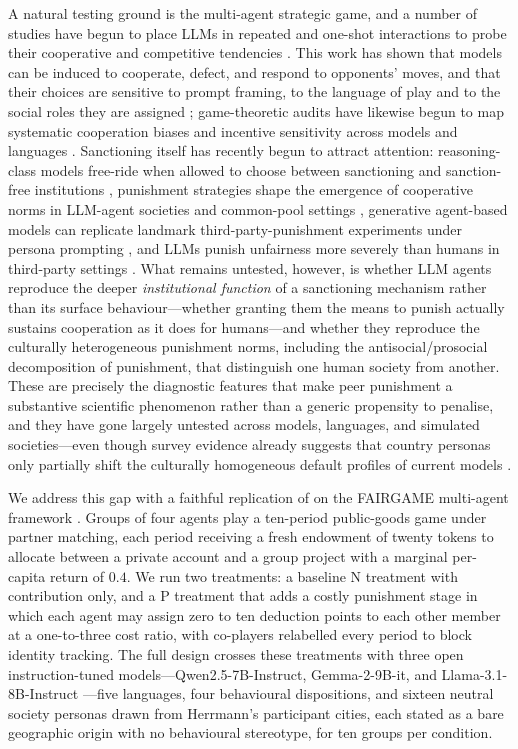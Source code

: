 \documentclass[openacc]{rsproca_new}
\begin{document}
A natural testing ground is the multi-agent strategic game, and a number of studies have begun to place LLMs in repeated and one-shot interactions to probe their cooperative and competitive tendencies \cite{akata2023playing, brookins2023playing, feng2024survey}. This work has shown that models can be induced to cooperate, defect, and respond to opponents' moves, and that their choices are sensitive to prompt framing, to the language of play and to the social roles they are assigned \cite{leng2023llm, tjuatja2024llms, buscemi2025communication}; game-theoretic audits have likewise begun to map systematic cooperation biases and incentive sensitivity across models and languages \cite{huynh2025understanding, huynh2026payoff}. Sanctioning itself has recently begun to attract attention: reasoning-class models free-ride when allowed to choose between sanctioning and sanction-free institutions \cite{piedrahita2025corrupted}, punishment strategies shape the emergence of cooperative norms in LLM-agent societies and common-pool settings \cite{warnakulasuriya2025evolution, gupta2025norm}, generative agent-based models can replicate landmark third-party-punishment experiments under persona prompting \cite{cross2025validating}, and LLMs punish unfairness more severely than humans in third-party settings \cite{liu2025outraged}. What remains untested, however, is whether LLM agents reproduce the deeper \emph{institutional function} of a sanctioning mechanism rather than its surface behaviour---whether granting them the means to punish actually sustains cooperation as it does for humans---and whether they reproduce the culturally heterogeneous punishment norms, including the antisocial/prosocial decomposition of punishment, that distinguish one human society from another. These are precisely the diagnostic features that make peer punishment a substantive scientific phenomenon rather than a generic propensity to penalise, and they have gone largely untested across models, languages, and simulated societies---even though survey evidence already suggests that country personas only partially shift the culturally homogeneous default profiles of current models \cite{tao2024cultural}.

We address this gap with a faithful replication of \cite{herrmann2008antisocial} on the FAIRGAME multi-agent framework \cite{fairgame2025}. Groups of four agents play a ten-period public-goods game under partner matching, each period receiving a fresh endowment of twenty tokens to allocate between a private account and a group project with a marginal per-capita return of $0.4$. We run two treatments: a baseline N treatment with contribution only, and a P treatment that adds a costly punishment stage in which each agent may assign zero to ten deduction points to each other member at a one-to-three cost ratio, with co-players relabelled every period to block identity tracking. The full design crosses these treatments with three open instruction-tuned models---Qwen2.5-7B-Instruct, Gemma-2-9B-it, and Llama-3.1-8B-Instruct \cite{qwen2025, gemma2024, llama2024}---five languages, four behavioural dispositions, and sixteen neutral society personas drawn from Herrmann's participant cities, each stated as a bare geographic origin with no behavioural stereotype, for ten groups per condition.
\end{document}
